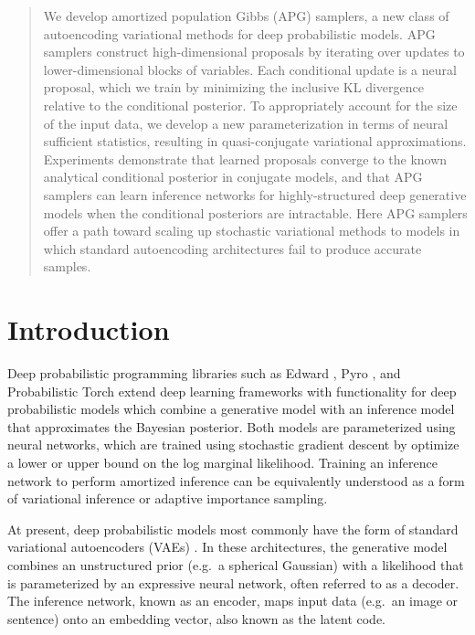 \documentclass{article}
\theoremstyle{definition}
\begin{document}
\begin{abstract}
We develop amortized population Gibbs (APG) samplers, a new class of autoencoding variational methods for deep probabilistic models. APG samplers construct high-dimensional proposals by iterating over updates to lower-dimensional blocks of variables. Each conditional update is a neural proposal, which we train by minimizing the inclusive KL divergence relative to the conditional posterior. To appropriately account for the size of the input data, we develop a new parameterization in terms of neural sufficient statistics, resulting in quasi-conjugate variational approximations. Experiments demonstrate that learned proposals converge to the known analytical conditional posterior in conjugate models, and that APG samplers can learn inference networks for highly-structured deep generative models when the conditional posteriors are intractable. Here APG samplers offer a path toward scaling up stochastic variational methods to models in which standard autoencoding architectures fail to produce accurate samples.
\end{abstract}

\section{Introduction}

\label{introduction}

Deep probabilistic programming libraries such as Edward \cite{tran2016edward}, Pyro \cite{bingham2018pyro}, and Probabilistic Torch \cite{siddharth2017learning}  extend deep learning frameworks with functionality for deep probabilistic models which combine a generative model with an inference model that approximates the Bayesian posterior.
Both models are parameterized using neural networks, which are trained using stochastic gradient descent by optimize a lower or upper bound on the log marginal likelihood. Training an inference network to perform amortized inference can be equivalently understood as a form of variational inference or adaptive importance sampling.

At present, deep probabilistic models most commonly have the form of standard variational autoencoders (VAEs) \cite{kingma2013auto-encoding, rezende2014stochastic}. In these architectures, the  generative model combines an unstructured prior (e.g.~a spherical Gaussian) with a likelihood that is parameterized by an expressive neural network, often referred to as a decoder. The inference network, known as an encoder, maps input data (e.g.~an image or sentence) onto an embedding vector, also known as the latent code.
\end{document}
